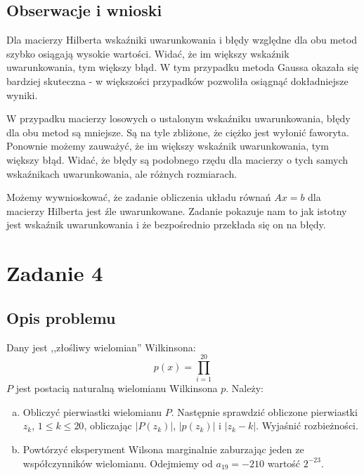 \documentclass{article}
\begin{document}
\subsection{Obserwacje i wnioski}
Dla macierzy Hilberta wskaźniki uwarunkowania i błędy względne dla obu metod szybko osiągają wysokie wartości. Widać,
że im większy wskaźnik uwarunkowania, tym większy błąd. W tym przypadku metoda Gaussa okazała się bardziej skuteczna -
w większości przypadków pozwoliła osiągnąć dokładniejsze wyniki.

W przypadku macierzy losowych o ustalonym wskaźniku uwarunkowania, błędy dla obu metod są mniejsze. Są na tyle zbliżone,
że ciężko jest wyłonić faworyta. Ponownie możemy zauważyć, że im większy wskaźnik uwarunkowania, tym większy błąd.
Widać, że błędy są podobnego rzędu dla macierzy o tych samych wskaźnikach uwarunkowania, ale różnych rozmiarach.

Możemy wywnioskować, że zadanie obliczenia układu równań $Ax = b$ dla macierzy Hilberta jest źle uwarunkowane.
Zadanie pokazuje nam to jak istotny jest wskaźnik uwarunkowania i że bezpośrednio przekłada się on na błędy.

\section{Zadanie 4}
\subsection{Opis problemu}
Dany jest ,,złośliwy wielomian'' Wilkinsona:
$$p(x) = \prod_{i = 1}^{20}$$
$P$ jest postacią naturalną wielomianu Wilkinsona $p$. Należy:

\begin{enumerate}[(a)]
    \item Obliczyć pierwiastki wielomianu $P$. Następnie sprawdzić obliczone pierwiastki \( z_k \),
    \( 1 \leq k \leq 20 \), obliczając \( |P(z_k)| \), \( |p(z_k)| \) i \( |z_k - k| \). Wyjaśnić rozbieżności.

    \item Powtórzyć eksperyment Wilsona marginalnie zaburzając jeden ze współczynników wielomianu. Odejmiemy od
    $a_{19} = -210$ wartość $2^{-23}$.
\end{enumerate}
\end{document}
